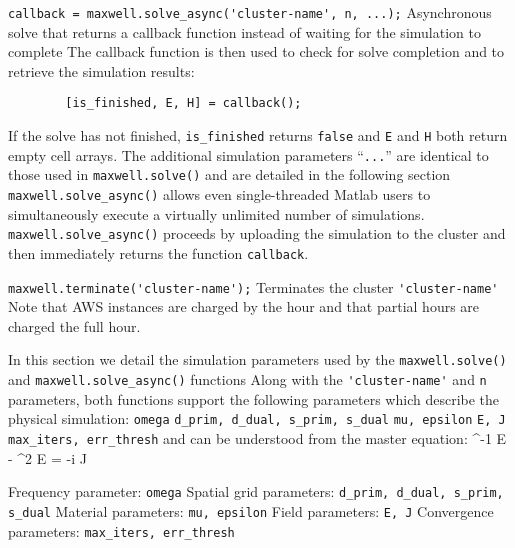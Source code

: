 \documentclass[landscape]{foils}
\renewcommand{\oursection}[1]{
\foilhead[-1.0cm]{#1}
}
\begin{document}
\BIT 
\I  \verb+callback = maxwell.solve_async('cluster-name', n, ...);+
    \BIT
    \I  Asynchronous solve that returns a callback function instead of waiting
        for the simulation to complete 
    \I  The callback function is then used to check for solve completion and 
        to retrieve the simulation results:
        \begin{verbatim}
        [is_finished, E, H] = callback();
        \end{verbatim}
    \I  If the solve has not finished, \verb+is_finished+ returns \verb+false+ and 
        \verb+E+ and \verb+H+ both return empty cell arrays.
    \I  The additional simulation parameters ``\verb+...+'' are identical to those 
        used in \verb+maxwell.solve()+ and are detailed in the following section
    \EIT
\I  \verb+maxwell.solve_async()+ allows even single-threaded Matlab users to simultaneously execute
    a virtually unlimited number of simulations.
    \BIT
    \I  \verb+maxwell.solve_async()+ proceeds by uploading the simulation to the cluster
        and then immediately returns the function \verb+callback+.
    \EIT
\EIT

\newpage
\BIT
\I  \verb+maxwell.terminate('cluster-name');+
    \BIT
    \I  Terminates the cluster \verb+'cluster-name'+
    \I  Note that AWS instances are charged by the hour and that partial hours
        are charged the full hour.
    \EIT
\EIT

\oursection{How Maxwell solves electromagnetics}
\BIT
\I  In this section we detail the simulation parameters used by the 
    \verb+maxwell.solve()+ and \verb+maxwell.solve_async()+ functions
\I  Along with the \verb+'cluster-name'+ and \verb+n+ parameters, both
    functions support the following parameters which describe the physical simulation:
    \BIT
    \I  \verb+omega+
    \I  \verb+d_prim, d_dual, s_prim, s_dual+
    \I  \verb+mu, epsilon+
    \I  \verb+E, J+
    \I  \verb+max_iters, err_thresh+
    \EIT
    and can be understood from the master equation:
    \BEQ
    \nabla \times \mu^{-1} \nabla \times E - \omega^2 \epsilon E = -i \omega J
    \EEQ

\newpage
\I  Frequency parameter: \verb+omega+
\I  Spatial grid parameters: \verb+d_prim, d_dual, s_prim, s_dual+
\I  Material parameters: \verb+mu, epsilon+
\I  Field parameters: \verb+E, J+
\I  Convergence parameters: \verb+max_iters, err_thresh+
\EIT
\end{document}
